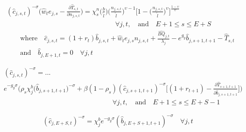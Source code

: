 \documentclass[letterpaper,12pt]{article}
\theoremstyle{definition}
\begin{document}
\begin{spacing}{1.5}
    \begin{equation}\label{EqEulerLabStat}
      \begin{split}
        &(\hat{c}_{j,s,t})^{-\sigma}\Biggl(\hat{w}_t e_{j,s} - \frac{\partial\hat{T}_{s,t}}{\partial n_{j,s,t}}\Biggr) = \chi^n_{s}\biggl(\frac{b}{\tilde{l}}\biggr)\biggl(\frac{n_{j,s,t}}{\tilde{l}}\biggr)^{\upsilon-1}\Biggl[1 - \biggl(\frac{n_{j,s,t}}{\tilde{l}}\biggr)^\upsilon\Biggr]^{\frac{1-\upsilon}{\upsilon}} \\
        &\qquad\qquad\qquad\qquad\qquad\qquad\qquad\qquad\forall j,t, \quad\text{and}\quad E+1\leq s\leq E+S \\
        &\qquad\text{where}\quad \hat{c}_{j,s,t} = \left(1 + r_t\right)\hat{b}_{j,s,t} + \hat{w}_t e_{j,s}n_{j,s,t} + \frac{\hat{BQ}_{j,t}}{\lambda_j} - e^{g_y}\hat{b}_{j,s+1,t+1} - \hat{T}_{s,t} \\
        &\qquad\text{and}\quad \hat{b}_{j,E+1,t} = 0 \quad\forall j,t
      \end{split}
    \end{equation}

    \begin{equation}\label{EqEulerSavStat}
      \begin{split}
        &(\hat{c}_{j,s,t})^{-\sigma} = ... \\
        &e^{-g_y\sigma}\Biggl(\rho_s\chi^b_j \bigl(\hat{b}_{j,s+1,t+1}\bigr)^{-\sigma} + \beta(1-\rho_s)(\hat{c}_{j,s+1,t+1})^{-\sigma}\Biggl[(1 + r_{t+1}) - \frac{\partial \hat{T}_{s+1,t+1}}{\partial \hat{b}_{j,s+1,t+1}}\Biggr]\Biggr) \\
        &\qquad\qquad\qquad\qquad\qquad\qquad\qquad\qquad\forall j,t,\quad\text{and}\quad E+1\leq s \leq E+S-1
      \end{split}
    \end{equation}

    \begin{equation}\label{EqEulerSavEpSstat}
      (\hat{c}_{j,E+S,t})^{-\sigma} = \chi^b_j e^{-g_y\sigma}(\hat{b}_{j,E+S+1,t+1})^{-\sigma} \quad\forall j,t
    \end{equation}


\end{spacing}
\end{document}
